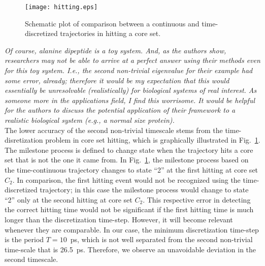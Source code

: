 \documentclass{article}
\begin{document}
\begin{figure}
  \centering
  \texttt{[image: hitting.eps]}
  \caption{Schematic plot of comparison between a continuous and time-discretized trajectories in hitting a core set.}
  \label{fig:tmp1}
\end{figure}


\textit{ Of course, alanine dipeptide is a toy system.  And, as the
  authors show, researchers may not be able to arrive at a perfect
  answer using their methods even for this toy system. I.e., the
  second non-trivial eigenvalue for their example had some error,
  already; therefore it would be my expectation that this would
  essentially be unresolvable (realistically) for biological systems
  of real interest.  As someone more in the applications field, I find
  this worrisome. It would be helpful for the authors to discuss the
  potential application of their framework to a realistic biological
  system (e.g., a normal size protein).
}\\


The lower accuracy of the second non-trivial timescale stems from the
time-disretization problem in core set hitting, which is graphically
illustrated in Fig.~\ref{fig:tmp1}.  The milestone process is defined
to change state when the trajectory hits a core set that is not the
one it came from.  In Fig.~\ref{fig:tmp1}, the milestone process based on the time-continuous trajectory changes to state ``2'' at the
first hitting at core set $C_2$. In comparison, the first hitting
event would not be recognized using the time-discretized trajectory; in this case 
the milestone process would change to state ``2'' only at the second
hitting at core set $C_2$. This respective error in detecting the correct hitting time would not be significant if the
first hitting time is much longer than the discretization time-step.
However, it will become relevant whenever they are comparable. In our case, the minimum discretization
time-step is the period $T=10$~ps, which is not well separated from the second non-trivial time-scale
that is 26.5~ps. Therefore, we observe an unavoidable deviation in the second timescale.\\
\end{document}
